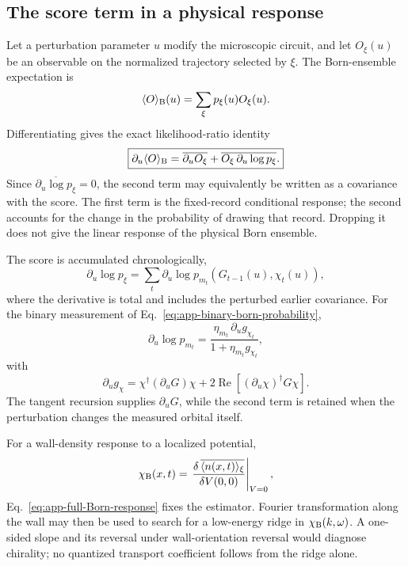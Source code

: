 \subsection{The score term in a physical response}

Let a perturbation parameter \(u\) modify the microscopic circuit, and let
\(O_\xi(u)\) be an observable on the normalized trajectory selected by
\(\xi\).  The Born-ensemble expectation is
\begin{equation}
    \langle O\rangle_{\rm B}(u)
    =\sum_\xi p_\xi(u)O_\xi(u).
\end{equation}
Differentiating gives the exact likelihood-ratio identity
\begin{equation}
    \boxed{
    \partial_u\langle O\rangle_{\rm B}
    =\overline{\partial_uO_\xi}
     +\overline{O_\xi\,\partial_u\log p_\xi}.}
    \label{eq:app-full-Born-response}
\end{equation}
Since \(\overline{\partial_u\log p_\xi}=0\), the second term may equivalently
be written as a covariance with the score.  The first term is the
fixed-record conditional response; the second accounts for the change in
the probability of drawing that record.  Dropping it does not give the
linear response of the physical Born ensemble.

The score is accumulated chronologically,
\begin{equation}
    \partial_u\log p_\xi
    =\sum_t\partial_u\log
      p_{m_t}\!\left(G_{t-1}(u),\chi_t(u)\right),
    \label{eq:app-record-score-sum}
\end{equation}
where the derivative is total and includes the perturbed earlier covariance.
For the binary measurement of Eq.~\eqref{eq:app-binary-born-probability},
\begin{equation}
    \partial_u\log p_{m_t}
    =\frac{\eta_{m_t}\,\partial_u g_{\chi_t}}
    {1+\eta_{m_t}g_{\chi_t}},
    \label{eq:app-binary-score}
\end{equation}
with
\begin{equation}
    \partial_u g_{\chi}
    =\chi^\dagger(\partial_uG)\chi
     +2\operatorname{Re}
      \left[(\partial_u\chi)^\dagger G\chi\right].
\end{equation}
The tangent recursion supplies \(\partial_uG\), while the second term is
retained when the perturbation changes the measured orbital itself.

For a wall-density response to a localized potential,
\begin{equation}
    \chi_{\rm B}(x,t)
    =\left.\frac{\delta\,\overline{\langle n(x,t)\rangle_\xi}}
    {\delta V(0,0)}\right|_{V=0},
    \label{eq:app-Born-wall-response}
\end{equation}
Eq.~\eqref{eq:app-full-Born-response} fixes the estimator.  Fourier
transformation along the wall may then be used to search for a low-energy
ridge in \(\chi_{\rm B}(k,\omega)\).  A one-sided slope and its reversal
under wall-orientation reversal would diagnose chirality; no quantized
transport coefficient follows from the ridge alone.

